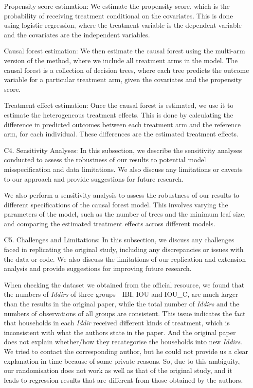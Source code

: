 \documentclass[AER]{AEA}
\begin{document}
Propensity score estimation: We estimate the propensity score, which is
the probability of receiving treatment conditional on the covariates.
This is done using logistic regression, where the treatment variable is
the dependent variable and the covariates are the independent variables.

Causal forest estimation: We then estimate the causal forest using the
multi-arm version of the method, where we include all treatment arms in
the model. The causal forest is a collection of decision trees, where
each tree predicts the outcome variable for a particular treatment arm,
given the covariates and the propensity score.

Treatment effect estimation: Once the causal forest is estimated, we use
it to estimate the heterogeneous treatment effects. This is done by
calculating the difference in predicted outcomes between each treatment
arm and the reference arm, for each individual. These differences are
the estimated treatment effects.

C4. Sensitivity Analyses: In this subsection, we describe the
sensitivity analyses conducted to assess the robustness of our results
to potential model misspecification and data limitations. We also
discuss any limitations or caveats to our approach and provide
suggestions for future research.

We also perform a sensitivity analysis to assess the robustness of our
results to different specifications of the causal forest model. This
involves varying the parameters of the model, such as the number of
trees and the minimum leaf size, and comparing the estimated treatment
effects across different models.

C5. Challenges and Limitations: In this subsection, we discuss any
challenges faced in replicating the original study, including any
discrepancies or issues with the data or code. We also discuss the
limitations of our replication and extension analysis and provide
suggestions for improving future research.

When checking the dataset we obtained from the official resource, we
found that the numbers of \textit{Iddirs} of three groups---IBI, IOU and
IOU\_C, are much larger than the results in the original paper, while
the total number of \textit{Iddirs} and the numbers of observations of
all groups are consistent. This issue indicates the fact that households
in each \textit{Iddir} received different kinds of treatment, which is
inconsistent with what the authors state in the paper. And the original
paper does not explain whether/how they recategorise the households into
new \textit{Iddirs}. We tried to contact the corresponding author, but
he could not provide us a clear explanation in time because of some
private reasons. So, due to this ambiguity, our randomisation does not
work as well as that of the original study, and it leads to regression
results that are different from those obtained by the authors.
\end{document}
